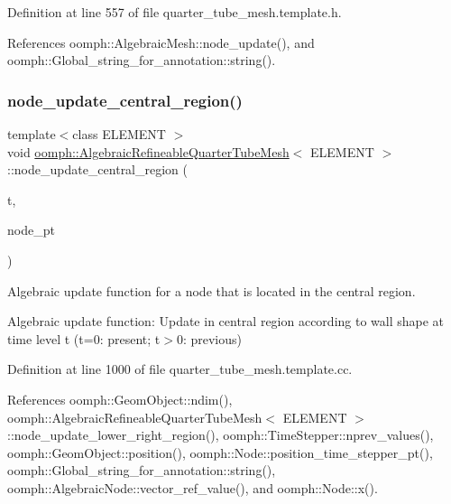 Definition at line 557 of file quarter\+\_\+tube\+\_\+mesh.\+template.\+h.



References oomph\+::\+Algebraic\+Mesh\+::node\+\_\+update(), and oomph\+::\+Global\+\_\+string\+\_\+for\+\_\+annotation\+::string().

\mbox{\label{classoomph_1_1AlgebraicRefineableQuarterTubeMesh_a064653020f5d2a0c7de789283dac305c}} 
\subsubsection{\texorpdfstring{node\+\_\+update\+\_\+central\+\_\+region()}{node\_update\_central\_region()}}
{\footnotesize\ttfamily template$<$class E\+L\+E\+M\+E\+NT $>$ \\
void \hyperlink{classoomph_1_1AlgebraicRefineableQuarterTubeMesh}{oomph\+::\+Algebraic\+Refineable\+Quarter\+Tube\+Mesh}$<$ E\+L\+E\+M\+E\+NT $>$\+::node\+\_\+update\+\_\+central\+\_\+region (\begin{DoxyParamCaption}\item[{const unsigned \&}]{t,  }\item[{\hyperlink{classoomph_1_1AlgebraicNode}{Algebraic\+Node} $\ast$\&}]{node\+\_\+pt }\end{DoxyParamCaption})\hspace{0.3cm}{\ttfamily [private]}}



Algebraic update function for a node that is located in the central region. 

Algebraic update function\+: Update in central region according to wall shape at time level t (t=0\+: present; t$>$0\+: previous) 

Definition at line 1000 of file quarter\+\_\+tube\+\_\+mesh.\+template.\+cc.



References oomph\+::\+Geom\+Object\+::ndim(), oomph\+::\+Algebraic\+Refineable\+Quarter\+Tube\+Mesh$<$ E\+L\+E\+M\+E\+N\+T $>$\+::node\+\_\+update\+\_\+lower\+\_\+right\+\_\+region(), oomph\+::\+Time\+Stepper\+::nprev\+\_\+values(), oomph\+::\+Geom\+Object\+::position(), oomph\+::\+Node\+::position\+\_\+time\+\_\+stepper\+\_\+pt(), oomph\+::\+Global\+\_\+string\+\_\+for\+\_\+annotation\+::string(), oomph\+::\+Algebraic\+Node\+::vector\+\_\+ref\+\_\+value(), and oomph\+::\+Node\+::x().



